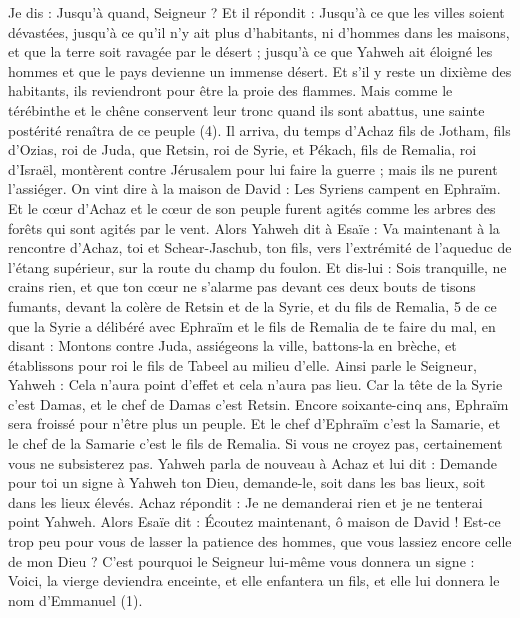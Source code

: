 \begin{multicols}{2}
Je dis : Jusqu’à quand, Seigneur ? Et il répondit : Jusqu’à ce que les villes soient dévastées, jusqu’à ce qu'il n'y ait plus d'habitants, ni d'hommes dans les maisons, et que la terre soit ravagée par le désert ;
jusqu’à ce que Yahweh ait éloigné les hommes et que le pays devienne un immense désert.
Et s’il y reste un dixième des habitants, ils reviendront pour être la proie des flammes. Mais comme le térébinthe et le chêne conservent leur tronc quand ils sont abattus, une sainte postérité renaîtra de ce peuple (4).
\VerseOne{}Il arriva, du temps d'Achaz fils de Jotham, fils d'Ozias, roi de Juda, que Retsin, roi de Syrie, et Pékach, fils de Remalia, roi d'Israël, montèrent contre Jérusalem pour lui faire la guerre ; mais ils ne purent l’assiéger.
On vint dire à la maison de David : Les Syriens campent en Ephraïm. Et le cœur d'Achaz et le cœur de son peuple furent agités comme les arbres des forêts qui sont agités par le vent.
Alors Yahweh dit à Esaïe : Va maintenant à la rencontre d'Achaz, toi et Schear-Jaschub, ton fils, vers l’extrémité de l’aqueduc de l’étang supérieur, sur la route du champ du foulon.
Et dis-lui : Sois tranquille, ne crains rien, et que ton cœur ne s’alarme pas devant ces deux bouts de tisons fumants, devant la colère de Retsin et de la Syrie, et du fils de Remalia, 5 de ce que la Syrie a délibéré avec Ephraïm et le fils de Remalia de te faire du mal, en disant :
Montons contre Juda, assiégeons la ville, battons-la en brèche, et établissons pour roi le fils de Tabeel au milieu d'elle.
Ainsi parle le Seigneur, Yahweh : Cela n'aura point d'effet et cela n’aura pas lieu.
Car la tête de la Syrie c'est Damas, et le chef de Damas c'est Retsin. Encore soixante-cinq ans, Ephraïm sera froissé pour n'être plus un peuple.
Et le chef d'Ephraïm c'est la Samarie, et le chef de la Samarie c'est le fils de Remalia. Si vous ne croyez pas, certainement vous ne subsisterez pas.
\TextTitle{[Emmanuel]}
Yahweh parla de nouveau à Achaz et lui dit :
Demande pour toi un signe à Yahweh ton Dieu, demande-le, soit dans les bas lieux, soit dans les lieux élevés.
Achaz répondit : Je ne demanderai rien et je ne tenterai point Yahweh.
Alors Esaïe dit : Écoutez maintenant, ô maison de David ! Est-ce trop peu pour vous de lasser la patience des hommes, que vous lassiez encore celle de mon Dieu ?
C'est pourquoi le Seigneur lui-même vous donnera un signe : Voici, la vierge deviendra enceinte, et elle enfantera un fils, et elle lui donnera le nom d’Emmanuel (1).

\end{multicols}
